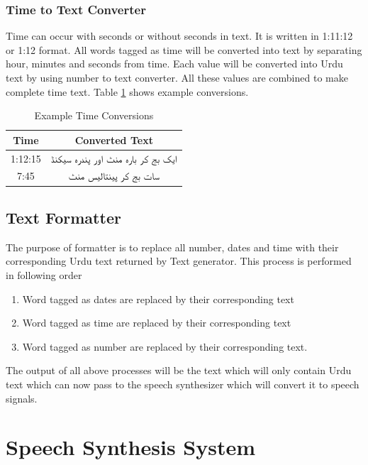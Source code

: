 \begin{itemize}
\subsubsection{Time to Text Converter}

Time can occur with seconds or without seconds in text. It is written in 1:11:12 or 1:12 format. All words tagged as time will be converted into text 
by separating hour, minutes and seconds from time. Each value will be converted into Urdu text by using number to text converter. All these values are 
combined to make complete time text. Table \ref{table:example_time_conversion} shows example conversions.

\begin{table}[]
\centering
\begin{tabular}{|c|c|}
\hline
\textbf{Time} & \textbf{Converted Text}                        \\ \hline
1:12:15       & \texturdu{ایک بج کر  بارہ منٹ اور پندرہ سیکنڈ} \\ \hline
7:45          & \texturdu{سات بج کر پینتالیس منٹ}              \\ \hline
\end{tabular}
\caption{Example Time Conversions}
\label{table:example_time_conversion}
\end{table}

\subsection{Text Formatter}
The purpose of formatter is to replace all number, dates and time with their corresponding Urdu text returned by Text generator. 
This process is performed in following order
\begin{enumerate}
  \item Word tagged as dates are replaced by their corresponding text
  \item Word tagged as time are replaced by their corresponding text
  \item Word tagged as number are replaced by their corresponding text. 
\end{enumerate}
The output of all above processes will be the text which will only contain Urdu text which can now pass to the speech synthesizer which will convert it to speech signals. 

\section{Speech Synthesis System}


\end{itemize}
